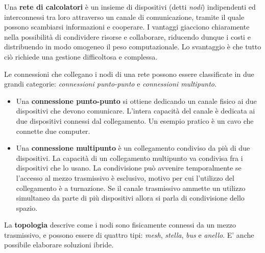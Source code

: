         Una \textbf{rete di calcolatori} è un insieme di dispositivi (detti \textit{nodi}) indipendenti ed interconnessi tra loro attraverso un canale di comunicazione, tramite il quale possono scambiarsi informazioni e cooperare. I vantaggi giacciono chiaramente nella possibilità di condividere risorse e collaborare, riducendo dunque i costi e distribuendo in modo omogeneo il peso computazionale. Lo svantaggio è che tutto ciò richiede una gestione difficoltosa e complessa.
        
        \vspace{3mm}
        
        Le connessioni che collegano i nodi di una rete possono essere classificate in due
        grandi categorie: \textit{connessioni punto-punto} e \textit{connessioni multipunto}.
        
        \begin{itemize}
            \item 
            Una \textbf{connessione punto-punto} si ottiene dedicando un canale fisico ai due dispositivi che devono comunicare. L’intera capacità del canale è dedicata ai due dispositivi connessi dal
            collegamento. Un esempio pratico è un cavo che connette due computer.
            
            \item
            Una \textbf{connessione multipunto} è un collegamento condiviso da più di due dispositivi. La capacità di un collegamento multipunto va condivisa fra i dispositivi che lo usano. La condivisione può avvenire temporalmente se l’accesso al mezzo trasmissivo è esclusivo, motivo per cui l'utilizzo del collegamento è a turnazione. Se il canale trasmissivo ammette un utilizzo simultaneo da parte di più dispositivi allora si parla di condivisione dello spazio.
        \end{itemize}
        
        La \textbf{topologia} descrive come i nodi sono fisicamente connessi da un mezzo trasmissivo, e possono essere di quattro tipi: \textit{mesh}, \textit{stella}, \textit{bus} e \textit{anello}. E' anche possibile elaborare soluzioni ibride.
        
